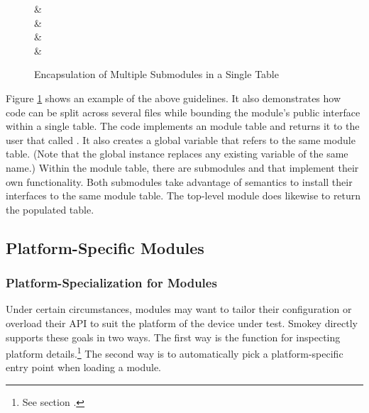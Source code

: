 \begin{lrbox}{\BoxC}
{\LstSize{}}
\end{lrbox}

\begin{lrbox}{\BoxD}
{\LstSize{}}
\end{lrbox}

\begin{figure}[h]

	\begin{CodeFilesListing}
		\usebox{\BoxA} & \UseLuaCodeBox{\RightBoxA} \\
		\usebox{\BoxB} & \UseLuaCodeBox{\RightBoxB} \\
		\usebox{\BoxC} & \UseLuaCodeBox{\RightBoxC} \\
		\usebox{\BoxD} & \UseLuaCodeBox{\RightBoxD} \\
	\end{CodeFilesListing}

	\caption{Encapsulation of Multiple Submodules in a Single Table}
	\label{fig:SubmoduleEncapsulation}

\end{figure}

Figure \ref{fig:SubmoduleEncapsulation} shows an example of the above
guidelines.  It also demonstrates how code can be split across several files
while bounding the module's public interface within a single table.  The code
implements an module table and returns it to the user that called
.  It also creates a global variable that refers to the same
module table.  (Note that the global instance replaces any existing variable of
the same name.)  Within the module table, there are submodules  and
 that implement their own functionality.  Both submodules take
advantage of  semantics to install their interfaces to the
same module table.  The top-level module does likewise to return the populated
table.

\subsection{Platform-Specific Modules}
\label{sec:PlatformSpecificModule}

\subsubsection{Platform-Specialization for Modules}

Under certain circumstances, modules may want to tailor their configuration or
overload their API to suit the platform of the device under test.  Smokey
directly supports these goals in two ways.  The first way is the
 function for inspecting platform details.\footnote{See
section .}  The second way is to automatically pick a
platform-specific entry point when loading a module.

